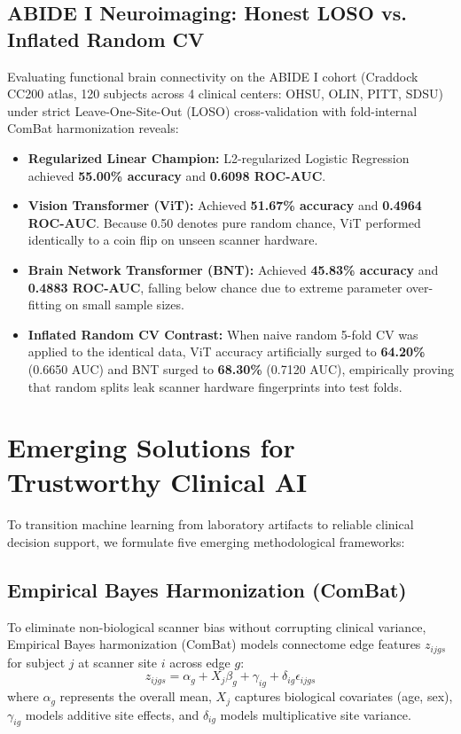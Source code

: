\documentclass[journal]{IEEEtran}
\begin{document}
\subsection{ABIDE I Neuroimaging: Honest LOSO vs. Inflated Random CV}
Evaluating functional brain connectivity on the ABIDE I cohort (Craddock CC200 atlas, 120 subjects across 4 clinical centers: OHSU, OLIN, PITT, SDSU) under strict Leave-One-Site-Out (LOSO) cross-validation with fold-internal ComBat harmonization reveals:
\begin{itemize}
    \item \textbf{Regularized Linear Champion:} L2-regularized Logistic Regression achieved \textbf{55.00\% accuracy} and \textbf{0.6098 ROC-AUC}.
    \item \textbf{Vision Transformer (ViT):} Achieved \textbf{51.67\% accuracy} and \textbf{0.4964 ROC-AUC}. Because 0.50 denotes pure random chance, ViT performed identically to a coin flip on unseen scanner hardware.
    \item \textbf{Brain Network Transformer (BNT):} Achieved \textbf{45.83\% accuracy} and \textbf{0.4883 ROC-AUC}, falling below chance due to extreme parameter over-fitting on small sample sizes.
    \item \textbf{Inflated Random CV Contrast:} When naive random 5-fold CV was applied to the identical data, ViT accuracy artificially surged to \textbf{64.20\%} (0.6650 AUC) and BNT surged to \textbf{68.30\%} (0.7120 AUC), empirically proving that random splits leak scanner hardware fingerprints into test folds.
\end{itemize}

\section{Emerging Solutions for Trustworthy Clinical AI}
To transition machine learning from laboratory artifacts to reliable clinical decision support, we formulate five emerging methodological frameworks:

\subsection{Empirical Bayes Harmonization (ComBat)}
To eliminate non-biological scanner bias without corrupting clinical variance, Empirical Bayes harmonization (ComBat) \cite{johnson2007adjusting, fortin2018harmonization} models connectome edge features $z_{ijgs}$ for subject $j$ at scanner site $i$ across edge $g$:
\begin{equation}
z_{ijgs} = \alpha_g + X_j \beta_g + \gamma_{ig} + \delta_{ig} \epsilon_{ijgs}
\end{equation}
where $\alpha_g$ represents the overall mean, $X_j$ captures biological covariates (age, sex), $\gamma_{ig}$ models additive site effects, and $\delta_{ig}$ models multiplicative site variance.
\end{document}
